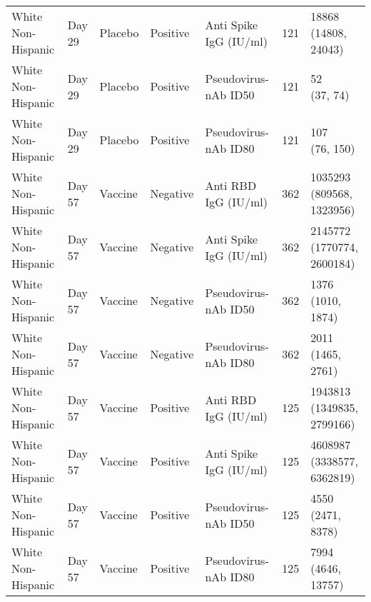 \documentclass[]{book}
\theoremstyle{definition}
\theoremstyle{definition}
\theoremstyle{definition}
\newcommand{\1}{\mathbbm{1}}
\begin{document}
\begin{landscape}
\begin{ThreePartTable}
\begin{longtable}[t]{>{\raggedright\arraybackslash}p{7cm}llllll}
\hspace{1em}White Non-Hispanic & Day 29 & Placebo & Positive & Anti Spike IgG (IU/ml) & 121 & \makecell[l]{18868\\(14808, 24043)}\\
\hspace{1em}White Non-Hispanic & Day 29 & Placebo & Positive & Pseudovirus-nAb ID50 & 121 & \makecell[l]{52\\(37, 74)}\\
\hspace{1em}White Non-Hispanic & Day 29 & Placebo & Positive & Pseudovirus-nAb ID80 & 121 & \makecell[l]{107\\(76, 150)}\\
\hspace{1em}White Non-Hispanic & Day 57 & Vaccine & Negative & Anti RBD IgG (IU/ml) & 362 & \makecell[l]{1035293\\(809568, 1323956)}\\
\hspace{1em}White Non-Hispanic & Day 57 & Vaccine & Negative & Anti Spike IgG (IU/ml) & 362 & \makecell[l]{2145772\\(1770774, 2600184)}\\
\hspace{1em}White Non-Hispanic & Day 57 & Vaccine & Negative & Pseudovirus-nAb ID50 & 362 & \makecell[l]{1376\\(1010, 1874)}\\
\hspace{1em}White Non-Hispanic & Day 57 & Vaccine & Negative & Pseudovirus-nAb ID80 & 362 & \makecell[l]{2011\\(1465, 2761)}\\
\hspace{1em}White Non-Hispanic & Day 57 & Vaccine & Positive & Anti RBD IgG (IU/ml) & 125 & \makecell[l]{1943813\\(1349835, 2799166)}\\
\hspace{1em}White Non-Hispanic & Day 57 & Vaccine & Positive & Anti Spike IgG (IU/ml) & 125 & \makecell[l]{4608987\\(3338577, 6362819)}\\
\hspace{1em}White Non-Hispanic & Day 57 & Vaccine & Positive & Pseudovirus-nAb ID50 & 125 & \makecell[l]{4550\\(2471, 8378)}\\
\hspace{1em}White Non-Hispanic & Day 57 & Vaccine & Positive & Pseudovirus-nAb ID80 & 125 & \makecell[l]{7994\\(4646, 13757)}\\

\end{longtable}
\end{ThreePartTable}
\end{landscape}
\end{document}
